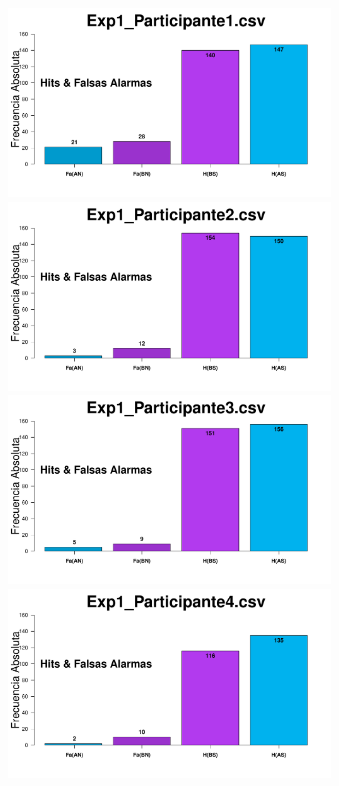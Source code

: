 \documentclass[a4paper ]{article}
\begin{document}
\begin{figure}[th]
\centering
\includegraphics[width=9cm, height=5cm]{Figures/MirrorRate_Exp1_P1} \includegraphics[width=9cm, height=5cm]{Figures/MirrorRate_Exp1_P2} 
\includegraphics[width=9cm, height=5cm]{Figures/MirrorRate_Exp1_P3} \includegraphics[width=9cm, height=5cm]{Figures/MirrorRate_Exp1_P4} 

\end{figure}
\end{document}

